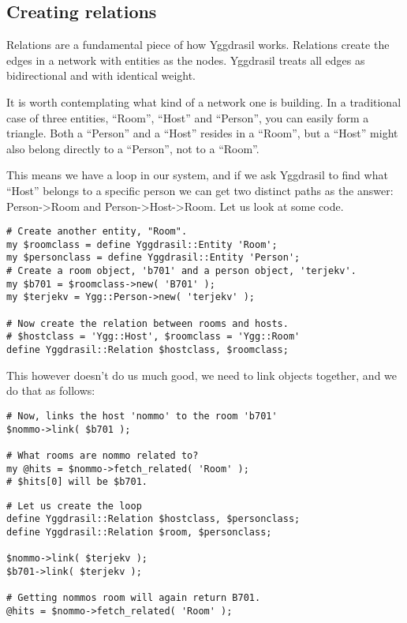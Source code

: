 \documentclass[english,a4paper]{article}
\begin{document}
\subsection{Creating relations}

Relations are a fundamental piece of how Yggdrasil works.  Relations
create the edges in a network with entities as the nodes.  Yggdrasil
treats all edges as bidirectional and with identical weight.  

It is worth contemplating what kind of a network one is building.  In
a traditional case of three entities, ``Room'', ``Host'' and
``Person'', you can easily form a triangle.  Both a ``Person'' and a
``Host'' resides in a ``Room'', but a ``Host'' might also belong
directly to a ``Person'', not to a ``Room''.

This means we have a loop in our system, and if we ask Yggdrasil to
find what ``Host'' belongs to a specific person we can get two
distinct paths as the answer: Person->Room and Person->Host->Room.
Let us look at some code.

\lstset{caption=Defining relations,label=relations}
\begin{lstlisting}
# Create another entity, "Room".
my $roomclass = define Yggdrasil::Entity 'Room';
my $personclass = define Yggdrasil::Entity 'Person';
# Create a room object, 'b701' and a person object, 'terjekv'.
my $b701 = $roomclass->new( 'B701' );
my $terjekv = Ygg::Person->new( 'terjekv' );

# Now create the relation between rooms and hosts.
# $hostclass = 'Ygg::Host', $roomclass = 'Ygg::Room'
define Yggdrasil::Relation $hostclass, $roomclass;
\end{lstlisting}

This however doesn't do us much good, we need to link objects
together, and we do that as follows:

\lstset{caption=Linking ``nommo'' to ``b701'',label=linking}
\begin{lstlisting}
# Now, links the host 'nommo' to the room 'b701'
$nommo->link( $b701 );

# What rooms are nommo related to?
my @hits = $nommo->fetch_related( 'Room' );
# $hits[0] will be $b701.
\end{lstlisting}


\lstset{caption=Creating a loop,label=looping}
\begin{lstlisting}
# Let us create the loop
define Yggdrasil::Relation $hostclass, $personclass;
define Yggdrasil::Relation $room, $personclass;

$nommo->link( $terjekv );
$b701->link( $terjekv );

# Getting nommos room will again return B701.
@hits = $nommo->fetch_related( 'Room' );
\end{lstlisting}
\end{document}
